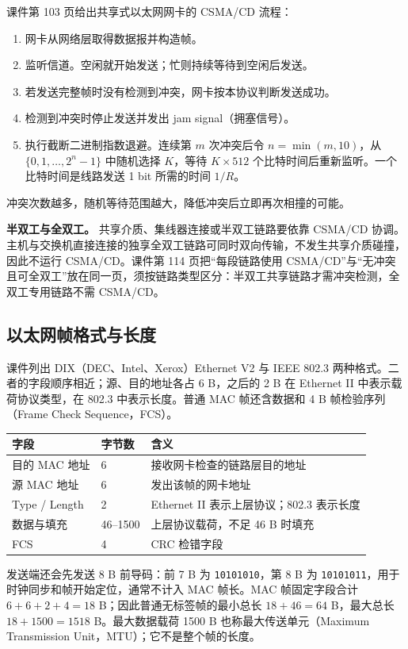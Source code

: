 课件第 103 页给出共享式以太网网卡的 CSMA/CD 流程：
\begin{enumerate}
 \item 网卡从网络层取得数据报并构造帧。
 \item 监听信道。空闲就开始发送；忙则持续等待到空闲后发送。
 \item 若发送完整帧时没有检测到冲突，网卡按本协议判断发送成功。
 \item 检测到冲突时停止发送并发出 jam signal（拥塞信号）。
 \item 执行截断二进制指数退避。连续第 $m$ 次冲突后令 $n=\min(m,10)$，从 $\{0,1,\ldots,2^n-1\}$ 中随机选择 $K$，等待 $K\times512$ 个比特时间后重新监听。一个比特时间是线路发送 1 bit 所需的时间 $1/R$。
\end{enumerate}
冲突次数越多，随机等待范围越大，降低冲突后立即再次相撞的可能。

\textbf{半双工与全双工。} 共享介质、集线器连接或半双工链路要依靠 CSMA/CD 协调。主机与交换机直接连接的独享全双工链路可同时双向传输，不发生共享介质碰撞，因此不运行 CSMA/CD。课件第 114 页把“每段链路使用 CSMA/CD”与“无冲突且可全双工”放在同一页，须按链路类型区分：半双工共享链路才需冲突检测，全双工专用链路不需 CSMA/CD。


\subsection{以太网帧格式与长度}
课件列出 DIX（DEC、Intel、Xerox）Ethernet V2 与 IEEE 802.3 两种格式。二者的字段顺序相近；源、目的地址各占 6 B，之后的 2 B 在 Ethernet II 中表示载荷协议类型，在 802.3 中表示长度。普通 MAC 帧还含数据和 4 B 帧检验序列（Frame Check Sequence，FCS）。

\begin{center}
\begin{tabularx}{0.98\textwidth}{l l X}
\toprule
字段 & 字节数 & 含义\\
\midrule
目的 MAC 地址 & 6 & 接收网卡检查的链路层目的地址\\
源 MAC 地址 & 6 & 发出该帧的网卡地址\\
Type / Length & 2 & Ethernet II 表示上层协议；802.3 表示长度\\
数据与填充 & 46--1500 & 上层协议载荷，不足 46 B 时填充\\
FCS & 4 & CRC 检错字段\\
\bottomrule
\end{tabularx}
\end{center}

发送端还会先发送 8 B 前导码：前 7 B 为 \texttt{10101010}，第 8 B 为 \texttt{10101011}，用于时钟同步和帧开始定位，通常不计入 MAC 帧长。MAC 帧固定字段合计 $6+6+2+4=18$ B；因此普通无标签帧的最小总长 $18+46=64$ B，最大总长 $18+1500=1518$ B。最大数据载荷 1500 B 也称最大传送单元（Maximum Transmission Unit，MTU）；它不是整个帧的长度。

